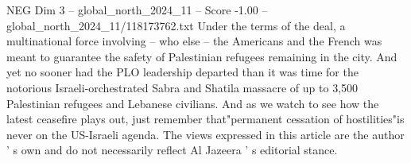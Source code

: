 \begin{textsample}{NEG Dim 3 – global\_north\_2024\_11 – Score -1.00 – global\_north\_2024\_11/118173762.txt}
Under the terms of the deal, a multinational force involving -- who else -- the Americans and the French was meant to guarantee the safety of Palestinian refugees remaining in the city.
And yet no sooner had the PLO leadership departed than it was time for the notorious Israeli-orchestrated Sabra and Shatila massacre of up to 3,500 Palestinian refugees and Lebanese civilians.
And as we watch to see how the latest ceasefire plays out, just remember that"permanent cessation of hostilities"is never on the US-Israeli agenda.
The views expressed in this article are the author ' s own and do not necessarily reflect Al Jazeera ' s editorial stance.

\end{textsample}
